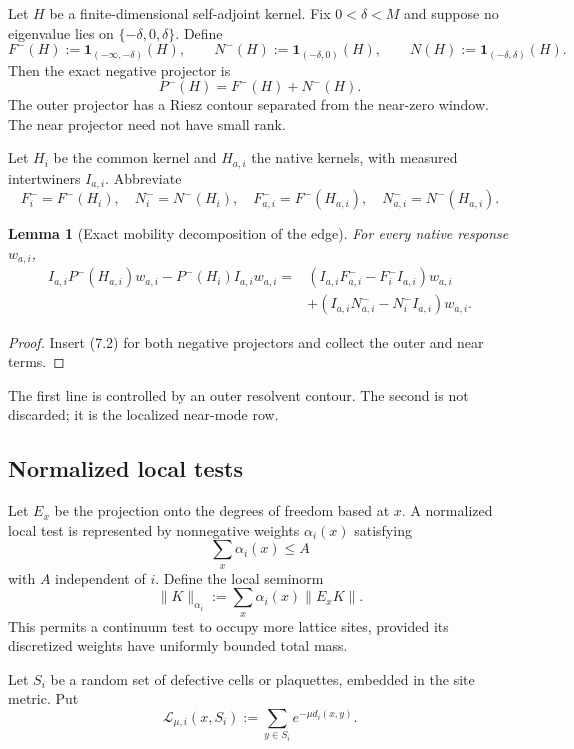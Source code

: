 \documentclass[11pt]{article}
\newtheorem{lemma}[theorem]{Lemma}
\begin{document}
Let \(H\) be a finite-dimensional self-adjoint kernel.  Fix
\(0<\delta<M\) and suppose no eigenvalue lies on
\(\{-\delta,0,\delta\}\).  Define
\[
 F^-(H):=\mathbf1_{(-\infty,-\delta)}(H),\qquad
 N^-(H):=\mathbf1_{(-\delta,0)}(H),\qquad
 N(H):=\mathbf1_{(-\delta,\delta)}(H).
 \tag{7.1}
\]
Then the exact negative projector is
\[
 P^-(H)=F^-(H)+N^-(H).
 \tag{7.2}
\]
The outer projector has a Riesz contour separated from the near-zero
window.  The near projector need not have small rank.

Let \(H_i\) be the common kernel and \(H_{a,i}\) the native kernels, with
measured intertwiners \(I_{a,i}\).  Abbreviate
\[
 F_i^-=F^-(H_i),\quad N_i^-=N^-(H_i),\quad
 F_{a,i}^-=F^-(H_{a,i}),\quad N_{a,i}^-=N^-(H_{a,i}).
 \tag{7.3}
\]

\begin{lemma}[Exact mobility decomposition of the edge]
\label{lem:v11v7-decomposition}
For every native response \(w_{a,i}\),
\[
\begin{split}
 I_{a,i}P^-(H_{a,i})w_{a,i}
 -P^-(H_i)I_{a,i}w_{a,i}
 ={}&
 (I_{a,i}F_{a,i}^- -F_i^-I_{a,i})w_{a,i}\\
 &+
 (I_{a,i}N_{a,i}^- -N_i^-I_{a,i})w_{a,i}.
\end{split}
\tag{7.4}
\]
\end{lemma}

\begin{proof}
Insert (7.2) for both negative projectors and collect the outer and near
terms.
\end{proof}

The first line is controlled by an outer resolvent contour.  The second is
not discarded; it is the localized near-mode row.

\subsection{Normalized local tests}

Let \(E_x\) be the projection onto the degrees of freedom based at
\(x\).  A normalized local test is represented by nonnegative weights
\(\alpha_i(x)\) satisfying
\[
 \sum_x\alpha_i(x)\leq A
 \tag{7.5}
\]
with \(A\) independent of \(i\).  Define the local seminorm
\[
 \|K\|_{\alpha_i}
 :=
 \sum_x\alpha_i(x)\|E_xK\|.
 \tag{7.6}
\]
This permits a continuum test to occupy more lattice sites, provided its
discretized weights have uniformly bounded total mass.

Let \(S_i\) be a random set of defective cells or plaquettes, embedded in
the site metric.  Put
\[
 \mathcal L_{\mu,i}(x,S_i)
 :=
 \sum_{y\in S_i}e^{-\mu d_i(x,y)}.
 \tag{7.7}
\]
\end{document}
